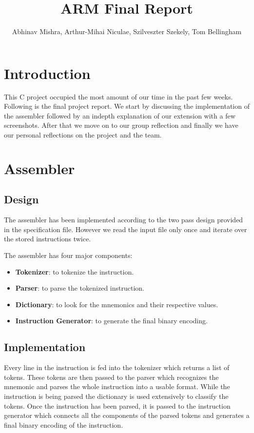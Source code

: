 \documentclass[11pt]{article}
\begin{document}
\title{ARM Final Report}
\author{
  Abhinav Mishra,
  Arthur-Mihai Niculae,
  Szilveszter Szekely,
  Tom Bellingham
}

\maketitle

\section{Introduction}
This C project occupied the most amount of our time in the past few weeks.
Following is the final project report. We start by discussing the implementation
of the assembler followed by an indepth explanation of our extension with a few
screenshots. After that we move on to our group reflection and finally we have 
our personal reflections on the project and the team.

\section{Assembler}

\subsection{Design}

The assembler has been implemented according to the two pass design provided in
the specification file. However we read the input file only once and iterate
over the stored instructions twice.

The assembler has four major components:
\begin{itemize}[noitemsep,topsep=0pt]
  \item \textbf{Tokenizer}:
    to tokenize the instruction.
  \item \textbf{Parser}:
    to parse the tokenized instruction.
  \item \textbf{Dictionary}:
    to look for the mnemonics and their respective values.
  \item \textbf{Instruction Generator}:
    to generate the final binary encoding.
\end{itemize}

\subsection{Implementation}

Every line in the instruction is fed into the tokenizer which returns a list
of tokens. These tokens are then passed to the parser which recognizes the
mnemonic and parses the whole instruction into a usable format. While the
instruction is being parsed the dictionary is used extensively to classify the
tokens. Once the instruction has been parsed, it is passed to the instruction
generator which connects all the components of the parsed tokens and generates
a final binary encoding of the instruction.
\end{document}
